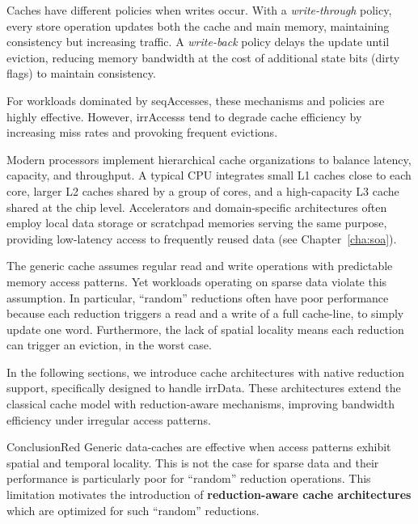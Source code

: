 Caches have different policies when writes occur.
With a \emph{write-through} policy, every store operation updates both the cache and main memory, maintaining consistency but increasing traffic.
A \emph{write-back} policy delays the update until \gls{eviction}, reducing memory bandwidth at the cost of additional state bits (dirty flags) to maintain consistency.

For workloads dominated by \gls{seqAccesses}, these mechanisms and policies are highly effective.
However, \glspl{irrAccess} tend to degrade cache efficiency by increasing \gls{miss} rates and provoking frequent \glspl{eviction}.

Modern processors implement hierarchical cache organizations to balance latency, capacity, and throughput.
A typical CPU integrates small L1 caches close to each core, larger L2 caches shared by a group of cores, and a high-capacity L3 cache shared at the chip level.
Accelerators and domain-specific architectures often employ local data storage or scratchpad memories serving the same purpose, providing low-latency access to frequently reused data (see Chapter~\ref{cha:soa}).

The generic cache assumes regular read and write operations with predictable memory access patterns.
Yet workloads operating on sparse data violate this assumption.
In particular, ``random'' \glspl{reduction} often have poor performance because each \gls{reduction} triggers a read and a write of a full cache-line, to simply update one word.
Furthermore, the lack of spatial locality means each \gls{reduction} can trigger an \gls{eviction}, in the worst case.

In the following sections, we introduce cache architectures with native \gls{reduction} support, specifically designed to handle \gls{irrData}.
These architectures extend the classical cache model with \gls{reduction}-aware mechanisms, improving bandwidth efficiency under irregular access patterns.

\begin{highlight}{Conclusion}{Red}
    Generic data-caches are effective when access patterns exhibit spatial and temporal locality.
    This is not the case for sparse data and their performance is particularly poor for ``random'' \gls{reduction} operations.
    This limitation motivates the introduction of \textbf{\gls{reduction}-aware cache architectures} which are optimized for such ``random'' \glspl{reduction}.
\end{highlight}